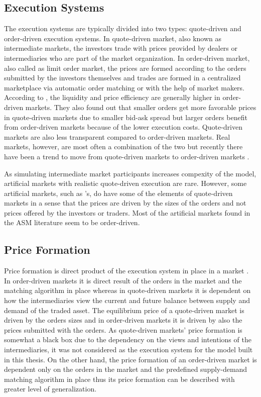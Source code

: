 \subsection{Execution Systems}
The execution systems are typically divided into two types:
quote-driven and order-driven execution systems. In quote-driven market, also known
as intermediate markets, the investors trade with prices provided 
by dealers or intermediaries who are part of the market organization. 
In order-driven market, also called as limit order market, 
the prices are formed according to the orders submitted by the 
investors themselves and trades are formed in a centralized marketplace 
via automatic order matching or with the help of market makers. 
\citep{Baru17} According to \citet{MALINOVA2013104},
the liquidity and price efficiency are generally higher in order-driven 
markets. They also found out that smaller orders get more favorable prices in 
quote-driven markets due to smaller bid-ask spread 
but larger orders benefit from order-driven markets because of the lower 
execution costs. Quote-driven markets are also less transparent compared
to order-driven markets. Real markets, however, are most often a combination
of the two \citep{boer05} but recently there have been a trend to move from quote-driven
markets to order-driven markets \citep{MALINOVA2013104}.

As simulating intermediate market participants increases compexity
of the model, artificial markets with realistic quote-driven execution are rare. 
However, some artificial markets, such as \citet{SantaFe99}'s, do have some of 
the elements of quote-driven markets in a sense that the prices are driven by 
the sizes of the orders and not prices offered by the investors or traders. 
Most of the artificial markets found in the ASM literature seem to be order-driven.

\subsection{Price Formation}
Price formation is direct product of the execution system in place in a market
\citep{boer05}. In order-driven markets it is direct result of the orders
in the market and the matching algorithm in place whereas in quote-driven markets it
is dependent on how the intermediaries view the current and future 
balance between supply and demand of the traded asset. The equilibrium price of a 
quote-driven market is driven by the orders sizes and in order-driven markets
it is driven by also the prices submitted with the orders. \citep{MALINOVA2013104}
As quote-driven markets' price formation is somewhat a black box due to the 
dependency on the views and intentions of the intermediaries, it was not considered
as the execution system for the model built in this thesis. On the other hand, 
the price formation of an order-driven market is dependent only on the orders in the
market and the predefined supply-demand matching algorithm in place thus its price 
formation can be described with greater level of generalization.

